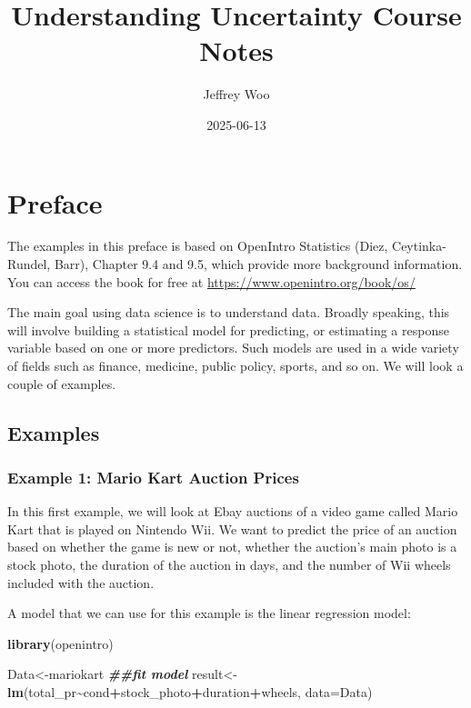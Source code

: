 \documentclass[
]{book}
\title{Understanding Uncertainty Course Notes}
\author{Jeffrey Woo}
\date{2025-06-13}
\newenvironment{Shaded}{\begin{snugshade}}{\end{snugshade}}
\newcommand{\AttributeTok}[1]{\textcolor[rgb]{0.13,0.29,0.53}{#1}}
\newcommand{\DocumentationTok}[1]{\textcolor[rgb]{0.56,0.35,0.01}{\textbf{\textit{#1}}}}
\newcommand{\FunctionTok}[1]{\textcolor[rgb]{0.13,0.29,0.53}{\textbf{#1}}}
\newcommand{\NormalTok}[1]{#1}
\newcommand{\OtherTok}[1]{\textcolor[rgb]{0.56,0.35,0.01}{#1}}
\newcommand{\SpecialCharTok}[1]{\textcolor[rgb]{0.81,0.36,0.00}{\textbf{#1}}}
\begin{document}
\maketitle

{
\setcounter{tocdepth}{1}
\tableofcontents
}
\chapter*{Preface}\label{preface}

The examples in this preface is based on OpenIntro Statistics (Diez, Ceytinka-Rundel, Barr), Chapter 9.4 and 9.5, which provide more background information. You can access the book for free at \url{https://www.openintro.org/book/os/}

The main goal using data science is to understand data. Broadly speaking, this will involve building a statistical model for predicting, or estimating a response variable based on one or more predictors. Such models are used in a wide variety of fields such as finance, medicine, public policy, sports, and so on. We will look a couple of examples.

\section{Examples}\label{examples}

\subsection{Example 1: Mario Kart Auction Prices}\label{example-1-mario-kart-auction-prices}

In this first example, we will look at Ebay auctions of a video game called Mario Kart that is played on Nintendo Wii. We want to predict the price of an auction based on whether the game is new or not, whether the auction's main photo is a stock photo, the duration of the auction in days, and the number of Wii wheels included with the auction.

A model that we can use for this example is the linear regression model:

\begin{Shaded}
\begin{Highlighting}[]
\FunctionTok{library}\NormalTok{(openintro)}

\NormalTok{Data}\OtherTok{\textless{}{-}}\NormalTok{mariokart}
\DocumentationTok{\#\#fit model}
\NormalTok{result}\OtherTok{\textless{}{-}}\FunctionTok{lm}\NormalTok{(total\_pr}\SpecialCharTok{\textasciitilde{}}\NormalTok{cond}\SpecialCharTok{+}\NormalTok{stock\_photo}\SpecialCharTok{+}\NormalTok{duration}\SpecialCharTok{+}\NormalTok{wheels, }\AttributeTok{data=}\NormalTok{Data)}
\end{Highlighting}
\end{Shaded}
\end{document}
